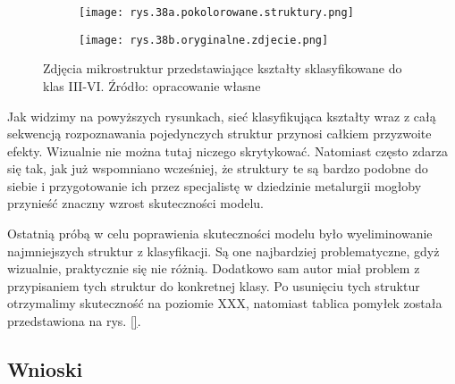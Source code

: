 \begin{figure}[h]
	\centering
	\begin{subfigure}{0.41\textwidth}
	    \centering
	    \texttt{[image: rys.38a.pokolorowane.struktury.png]}
	\end{subfigure}
	\begin{subfigure}{0.41\textwidth}
	    \centering
	    \texttt{[image: rys.38b.oryginalne.zdjecie.png]}
	\end{subfigure}
	\caption{\label{rys.38}Zdjęcia mikrostruktur przedstawiające kształty sklasyfikowane do klas III-VI. Źródło: opracowanie własne}
\end{figure}
\clearpage
\noindent Jak widzimy na powyższych rysunkach, sieć klasyfikująca kształty wraz z całą sekwencją rozpoznawania pojedynczych struktur przynosi całkiem przyzwoite efekty. Wizualnie nie można tutaj niczego skrytykować. Natomiast często zdarza się tak, jak już wspomniano wcześniej, że struktury te są bardzo podobne do siebie i przygotowanie ich przez specjalistę w dziedzinie metalurgii mogłoby przynieść znaczny wzrost skuteczności modelu.

Ostatnią próbą w celu poprawienia skuteczności modelu było wyeliminowanie najmniejszych struktur z klasyfikacji. Są one najbardziej problematyczne, gdyż wizualnie, praktycznie się nie różnią. Dodatkowo sam autor miał problem z przypisaniem tych struktur do konkretnej klasy. Po usunięciu tych struktur otrzymalimy skuteczność na poziomie XXX, natomiast tablica pomyłek została przedstawiona na rys. \ref{}. 

\subsection{Wnioski}
\label{klasyfikacja.struktur.wnioski}



%
%
%
%
%
%
%


